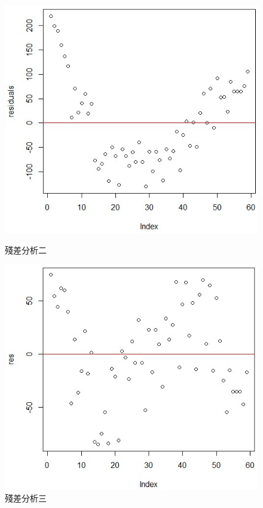 \documentclass[12pt, a4paper]{article}
\begin{document}
\begin{figure}[hbt]
\centering
	\begin{minipage}[b]{0.4\textwidth}
		\includegraphics[width=\textwidth]{figures/res1}
		\caption{殘差分析二}
		\label{fig:res1again}
	\end{minipage}
	\begin{minipage}[b]{0.05\textwidth}
		\quad
	\end{minipage}	
	\begin{minipage}[b]{0.4\textwidth}
		\includegraphics[width=\textwidth]{figures/res2}
		\caption{殘差分析三}
		\label{fig:res2}
	\end{minipage}
\end{figure}
\end{document}
